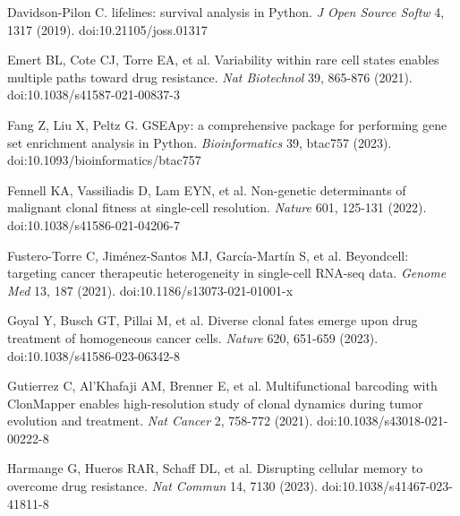 \documentclass[11pt,a4paper]{article}
\begin{document}
\noindent Davidson-Pilon C. lifelines: survival analysis in Python. \emph{J Open Source Softw} 4, 1317 (2019). doi:10.21105/joss.01317\par\vspace{2pt}

\noindent Emert BL, Cote CJ, Torre EA, et al. Variability within rare cell states enables multiple paths toward drug resistance. \emph{Nat Biotechnol} 39, 865-876 (2021). doi:10.1038/s41587-021-00837-3 \par\vspace{2pt}

\noindent Fang Z, Liu X, Peltz G. GSEApy: a comprehensive package for performing gene set enrichment analysis in Python. \emph{Bioinformatics} 39, btac757 (2023). doi:10.1093/bioinformatics/btac757\par\vspace{2pt}

\noindent Fennell KA, Vassiliadis D, Lam EYN, et al. Non-genetic determinants of malignant clonal fitness at single-cell resolution. \emph{Nature} 601, 125-131 (2022). doi:10.1038/s41586-021-04206-7\par\vspace{2pt}

\noindent Fustero-Torre C, Jim\'enez-Santos MJ, Garc\'ia-Mart\'in S, et al. Beyondcell: targeting cancer therapeutic heterogeneity in single-cell RNA-seq data. \emph{Genome Med} 13, 187 (2021). doi:10.1186/s13073-021-01001-x \par\vspace{2pt}

\noindent Goyal Y, Busch GT, Pillai M, et al. Diverse clonal fates emerge upon drug treatment of homogeneous cancer cells. \emph{Nature} 620, 651-659 (2023). doi:10.1038/s41586-023-06342-8 \par\vspace{2pt}

\noindent Gutierrez C, Al'Khafaji AM, Brenner E, et al. Multifunctional barcoding with ClonMapper enables high-resolution study of clonal dynamics during tumor evolution and treatment. \emph{Nat Cancer} 2, 758-772 (2021). doi:10.1038/s43018-021-00222-8 \par\vspace{2pt}

\noindent Harmange G, Hueros RAR, Schaff DL, et al. Disrupting cellular memory to overcome drug resistance. \emph{Nat Commun} 14, 7130 (2023). doi:10.1038/s41467-023-41811-8 \par\vspace{2pt}
\end{document}
